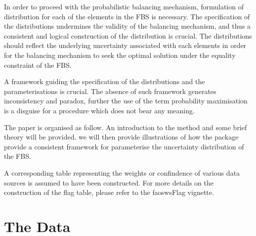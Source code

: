 \documentclass[nojss]{jss}\usepackage[]{graphicx}\usepackage[]{color}
\begin{document}
In order to proceed with the probabilistic balancing mechanism,
formulation of distribution for each of the elements in the FBS is
necessary. The specification of the distributions undermines the
validity of the balancing mechanism, and thus a consistent and logical
construction of the distribution is crucial. The distributions should
reflect the underlying uncertainty associated with each elements in
order for the balancing mechanism to seek the optimal solution under
the equality constraint of the FBS.

A framework guiding the specification of the distributions and the
parameterisations is crucial. The absence of such framework generates
inconsistency and paradox, further the use of the term probability
maximisation is a disguise for a procedure which does not bear any
meaning.


The paper is organised as follow. An introduction to the method and
some brief theory will be provided. we will then provide illustrations
of how the package provide a consistent framework for parameterise the
uncertainty distribution of the FBS. 

A corresponding table representing the weights or confindence of
various data sources is assumed to have been constructed. For more
details on the construction of the flag table, please refer to the
faoswsFlag vignette.



\section{The Data}
\end{document}
